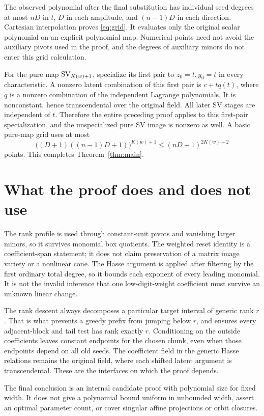The observed polynomial after the final substitution has individual
seed degrees at most $nD$ in $t$, $D$ in each amplitude, and
$(n-1)D$ in each direction. Cartesian interpolation proves
\eqref{eq:grid}. It evaluates only the original scalar polynomial on
an explicit polynomial map. Numerical points need not avoid the
auxiliary pivots used in the proof, and the degrees of auxiliary
minors do not enter this grid calculation.

For the pure map $\operatorname{SV}_{K(w)+1}$, specialize its first pair to
$z_0=t,y_0=t$ in every characteristic. A nonzero latent combination
of this first pair is $c+tq(t)$, where $q$ is a nonzero combination
of the independent Lagrange polynomials. It is nonconstant, hence
transcendental over the original field. All later SV stages are
independent of $t$. Therefore the entire preceding proof applies to
this first-pair specialization, and the unspecialized pure SV image
is nonzero as well. A basic pure-map grid uses at most
\[
 \bigl((D+1)((n-1)D+1)\bigr)^{K(w)+1}
 \le(nD+1)^{2K(w)+2}
\]
points. This completes Theorem~\ref{thm:main}.

\section{What the proof does and does not use}

The rank profile is used through constant-unit pivots and vanishing
larger minors, so it survives monomial box quotients. The weighted
reset identity is a coefficient-span statement; it does not claim
preservation of a matrix image variety or a nonlinear cone. The
Hasse argument is applied after filtering by the first ordinary total
degree, so it bounds each exponent of every leading monomial. It is
not the invalid inference that one low-digit-weight coefficient must
survive an unknown linear change.

The rank descent always decomposes a particular target interval of
generic rank $r$. That is what prevents a greedy prefix from jumping
below $r$, and ensures every adjacent-block and tail test has rank
exactly $r$. Conditioning on the outside coefficients leaves constant
endpoints for the chosen chunk, even when those endpoints depend on
all old seeds. The coefficient field in the generic Hasse relations
remains the original field, where each shifted latent argument is
transcendental. These are the interfaces on which the proof depends.

The final conclusion is an internal candidate proof with polynomial
size for fixed width. It does not give a polynomial bound uniform in
unbounded width, assert an optimal parameter count, or cover singular
affine projections or orbit closures.

